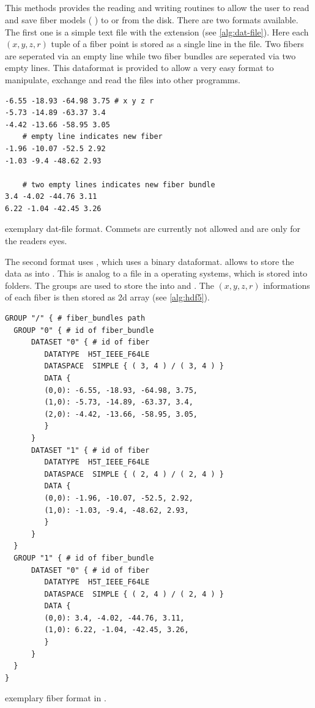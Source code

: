 \subsection{}
%
This methods provides the reading and writing routines to allow the user to read and save fiber models (\ie{} ) to or from the disk.
There are two formats available.
The first one is a simple text file with the extension  (see \cref{alg:dat-file}).
Here each $(x,y,z,r)$ tuple of a fiber point is stored as a single line in the file.
Two fibers are seperated via an empty line while two fiber bundles are seperated via two empty lines.
This dataformat is provided to allow a very easy format to manipulate, exchange and read the files \eg{} into other programms.
%
\begin{lstfloat}[!ht]
\begin{lstlisting}
-6.55 -18.93 -64.98 3.75 # x y z r
-5.73 -14.89 -63.37 3.4
-4.42 -13.66 -58.95 3.05
    # empty line indicates new fiber
-1.96 -10.07 -52.5 2.92
-1.03 -9.4 -48.62 2.93

    # two empty lines indicates new fiber bundle
3.4 -4.02 -44.76 3.11
6.22 -1.04 -42.45 3.26
\end{lstlisting}
\caption{exemplary dat-file format. Commets are currently not allowed and are only for the readers eyes.}\label{alg:dat-file}
\end{lstfloat}
%
%
\par
The second format uses \hdf{} \cite{hdf5}, which uses a binary dataformat.
\hdf{} allows to store the data as  into .
This is analog to a file in a operating systems, which is stored into folders.
The \hdf{} groups are used to store the  into  and .
The $(x,y,z,r)$ informations of each fiber is then stored as 2d array (see \cref{alg:hdf5}).
%
\begin{lstfloat}[!ht]
\begin{lstlisting}
GROUP "/" { # fiber_bundles path
  GROUP "0" { # id of fiber_bundle
      DATASET "0" { # id of fiber
         DATATYPE  H5T_IEEE_F64LE
         DATASPACE  SIMPLE { ( 3, 4 ) / ( 3, 4 ) }
         DATA {
         (0,0): -6.55, -18.93, -64.98, 3.75,
         (1,0): -5.73, -14.89, -63.37, 3.4,
         (2,0): -4.42, -13.66, -58.95, 3.05,
         }
      }
      DATASET "1" { # id of fiber
         DATATYPE  H5T_IEEE_F64LE
         DATASPACE  SIMPLE { ( 2, 4 ) / ( 2, 4 ) }
         DATA {
         (0,0): -1.96, -10.07, -52.5, 2.92,
         (1,0): -1.03, -9.4, -48.62, 2.93,
         }
      }
  }
  GROUP "1" { # id of fiber_bundle
      DATASET "0" { # id of fiber
         DATATYPE  H5T_IEEE_F64LE
         DATASPACE  SIMPLE { ( 2, 4 ) / ( 2, 4 ) }
         DATA {
         (0,0): 3.4, -4.02, -44.76, 3.11,
         (1,0): 6.22, -1.04, -42.45, 3.26,
         }
      }
  }
}
\end{lstlisting}
\caption{exemplary fiber format in \hdf{}.} \label{alg:hdf5}
\end{lstfloat}
%
%
%
